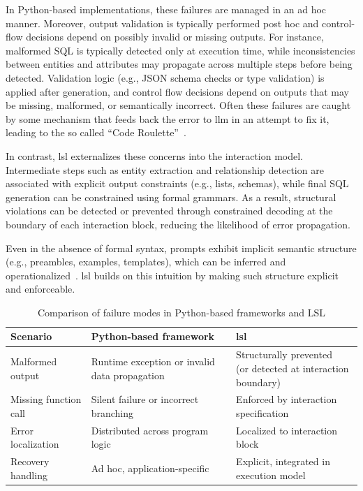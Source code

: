 \documentclass[manuscript,screen]{acmart}
\begin{document}
In Python-based implementations, these failures are managed in an ad hoc manner. 
Moreover, output validation is typically performed post hoc and control-flow decisions depend on possibly invalid or missing outputs. 
For instance, malformed SQL is typically detected only at execution time, while inconsistencies between entities and attributes may propagate across multiple steps before being detected. 
Validation logic (e.g., JSON schema checks or type validation) is applied after generation, and control flow decisions depend on outputs that may be missing, malformed, or semantically incorrect. 
Often these failures are caught by some mechanism that feeds back the error to \ac{llm} in an attempt to fix it, leading to the so called ``Code Roulette''~\cite{prompting-effecting-variability}.

In contrast, \ac{lsl} externalizes these concerns into the interaction model. 
Intermediate steps such as entity extraction and relationship detection are associated with explicit output constraints (e.g., lists, schemas), while final SQL generation can be constrained using formal grammars. 
As a result, structural violations can be detected or prevented through constrained decoding at the boundary of each interaction block, reducing the likelihood of error propagation.

Even in the absence of formal syntax, prompts exhibit implicit semantic structure (e.g., preambles, examples, templates), which can be inferred and operationalized~\cite{10.1145/3544549.3585737}.
\ac{lsl} builds on this intuition by making such structure explicit and enforceable.

\begin{table}[!ht]
\caption{Comparison of failure modes in Python-based frameworks and LSL}
\begin{center}
\begin{tabular}{lll}
\toprule

\textbf{Scenario} & \textbf{Python-based framework} & \textbf{\ac{lsl}} \\

\midrule

Malformed output & Runtime exception or invalid data propagation & \makecell[l]{Structurally prevented\\(or detected at interaction boundary)} \\

Missing function call & Silent failure or incorrect branching & Enforced by interaction specification \\

Error localization & Distributed across program logic & Localized to interaction block \\

Recovery handling & Ad hoc, application-specific & Explicit, integrated in execution model \\

\bottomrule

\end{tabular}
\end{center}
\label{tab:eval}
\end{table}
\end{document}
